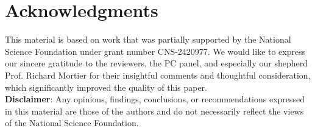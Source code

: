\section*{Acknowledgments}
This material is based on work that was partially supported by the National Science Foundation under grant number CNS-2420977. We would like to express our sincere gratitude to the reviewers, the PC panel, and especially our shepherd Prof. Richard Mortier for their insightful comments and thoughtful consideration, which significantly improved the quality of this paper. \\
\textbf{Disclaimer}: Any opinions, findings,
conclusions, or recommendations expressed in this material are those of the authors and do not necessarily
reflect the views of the National Science Foundation.
